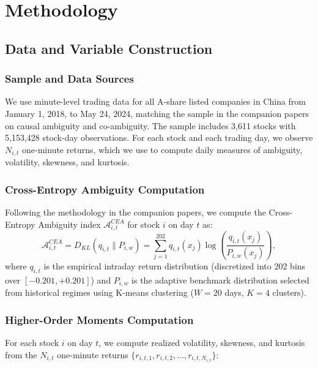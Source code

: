 \documentclass[preprint,12pt,authoryear]{elsarticle}
\begin{document}
\section{Methodology}

\subsection{Data and Variable Construction}

\subsubsection{Sample and Data Sources}

We use minute-level trading data for all A-share listed companies in China from January 1, 2018, to May 24, 2024, matching the sample in the companion papers on causal ambiguity and co-ambiguity. The sample includes 3,611 stocks with 5,153,428 stock-day observations. For each stock and each trading day, we observe $N_{i,t}$ one-minute returns, which we use to compute daily measures of ambiguity, volatility, skewness, and kurtosis.

\subsubsection{Cross-Entropy Ambiguity Computation}

Following the methodology in the companion papers, we compute the Cross-Entropy Ambiguity index $\mathcal{A}^{CEA}_{i,t}$ for stock $i$ on day $t$ as:
\begin{equation}
\mathcal{A}^{CEA}_{i,t} = D_{KL}(q_{i,t} \| P_{i,w}) = \sum_{j=1}^{202} q_{i,t}(x_j) \log\left(\frac{q_{i,t}(x_j)}{P_{i,w}(x_j)}\right),
\end{equation}
where $q_{i,t}$ is the empirical intraday return distribution (discretized into 202 bins over $[-0.201, +0.201]$) and $P_{i,w}$ is the adaptive benchmark distribution selected from historical regimes using K-means clustering ($W = 20$ days, $K = 4$ clusters).

\subsubsection{Higher-Order Moments Computation}

For each stock $i$ on day $t$, we compute realized volatility, skewness, and kurtosis from the $N_{i,t}$ one-minute returns $\{r_{i,t,1}, r_{i,t,2}, \ldots, r_{i,t,N_{i,t}}\}$:
\end{document}
